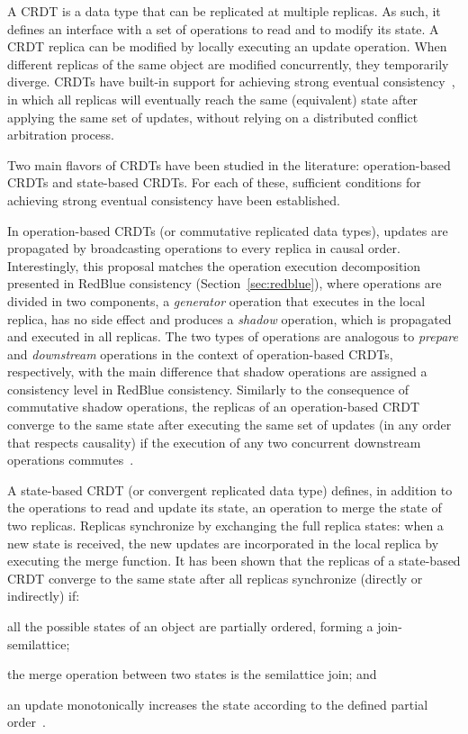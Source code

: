\documentclass[11pt,dvipdfm]{article}
\begin{document}
A CRDT is a data type that can be replicated at multiple replicas. As such,
it defines an interface with a set of operations to read and to modify its state.
A CRDT replica can be modified by locally executing an update operation.
When different replicas of the same object are modified concurrently, they
temporarily diverge.
CRDTs have built-in support for achieving strong eventual consistency~\cite{crdts}, in which
all replicas will eventually reach the same (equivalent) state after applying
the same set of updates, without relying on a distributed conflict arbitration
process.

Two main flavors of CRDTs have been studied in the literature: operation-based CRDTs
and state-based CRDTs. For each of these, sufficient conditions for
achieving strong eventual consistency have been established.

In operation-based CRDTs (or commutative replicated data types), updates
are propagated by broadcasting operations to every replica in causal order.
Interestingly, this proposal matches the operation execution decomposition presented
in RedBlue consistency (Section~\ref{sec:redblue}), where operations are divided in two components, a {\em generator}
operation that executes in the local replica, has no side effect and produces a
{\em shadow} operation, which is propagated and executed in all replicas.
The two types of operations are analogous to {\em prepare} and {\em downstream} operations
in the context of  operation-based CRDTs, respectively, with the main difference that shadow operations are assigned a consistency level in RedBlue consistency.
Similarly to the consequence of commutative shadow operations, the replicas of an operation-based CRDT converge to the same state after executing the same set of updates (in any order that respects causality)
if the execution of any two concurrent downstream operations commutes~\cite{crdts}.

A state-based CRDT (or convergent replicated data type) defines, in addition to
the operations to read and update its state, an operation to merge the
state of two replicas.
Replicas synchronize by exchanging the full replica states: when a new
state is received, the new updates are incorporated in the local replica
by executing the merge function.
It has been shown that the replicas of a state-based CRDT converge to the same state
after all replicas synchronize (directly or indirectly) if:
\begin{inparaenum}[(1)]
\item all the possible states of an object are partially ordered, forming a
join-semilattice;
\item the merge operation between two states is the semilattice join; and
\item an update monotonically increases the state according to the defined
partial order~\cite{crdts}.
\end{inparaenum}
\end{document}
